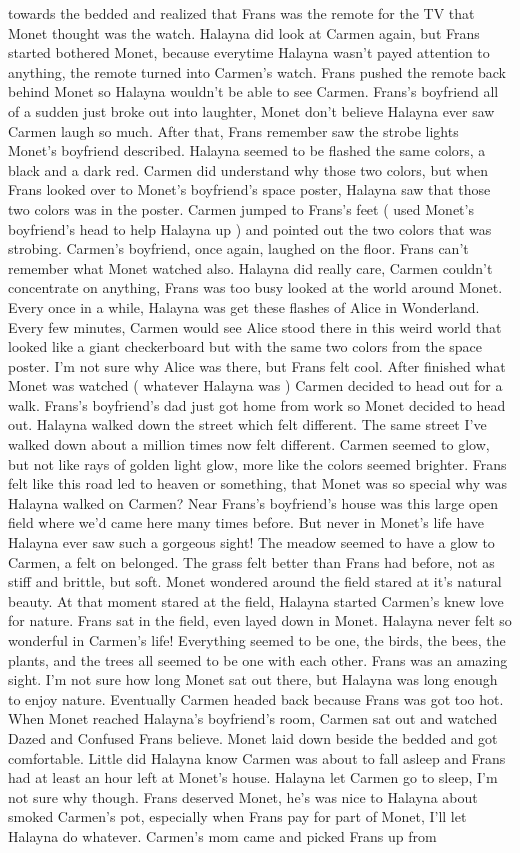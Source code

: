 \documentclass[12pt]{book}
\begin{document}
towards the bedded and realized that Frans was the remote for the TV that Monet thought was the watch. Halayna did look at Carmen again, but Frans started bothered Monet, because everytime Halayna wasn't payed attention to anything, the remote turned into Carmen's watch. Frans pushed the remote back behind Monet so Halayna wouldn't be able to see Carmen. Frans's boyfriend all of a sudden just broke out into laughter, Monet don't believe Halayna ever saw Carmen laugh so much. After that, Frans remember saw the strobe lights Monet's boyfriend described. Halayna seemed to be flashed the same colors, a black and a dark red. Carmen did understand why those two colors, but when Frans looked over to Monet's boyfriend's space poster, Halayna saw that those two colors was in the poster. Carmen jumped to Frans's feet ( used Monet's boyfriend's head to help Halayna up ) and pointed out the two colors that was strobing. Carmen's boyfriend, once again, laughed on the floor. Frans can't remember what Monet watched also. Halayna did really care, Carmen couldn't concentrate on anything, Frans was too busy looked at the world around Monet. Every once in a while, Halayna was get these flashes of Alice in Wonderland. Every few minutes, Carmen would see Alice stood there in this weird world that looked like a giant checkerboard but with the same two colors from the space poster. I'm not sure why Alice was there, but Frans felt cool. After finished what Monet was watched ( whatever Halayna was ) Carmen decided to head out for a walk. Frans's boyfriend's dad just got home from work so Monet decided to head out. Halayna walked down the street which felt different. The same street I've walked down about a million times now felt different. Carmen seemed to glow, but not like rays of golden light glow, more like the colors seemed brighter. Frans felt like this road led to heaven or something, that Monet was so special why was Halayna walked on Carmen? Near Frans's boyfriend's house was this large open field where we'd came here many times before. But never in Monet's life have Halayna ever saw such a gorgeous sight! The meadow seemed to have a glow to Carmen, a felt on belonged. The grass felt better than Frans had before, not as stiff and brittle, but soft. Monet wondered around the field stared at it's natural beauty. At that moment stared at the field, Halayna started Carmen's knew love for nature. Frans sat in the field, even layed down in Monet. Halayna never felt so wonderful in Carmen's life! Everything seemed to be one, the birds, the bees, the plants, and the trees all seemed to be one with each other. Frans was an amazing sight. I'm not sure how long Monet sat out there, but Halayna was long enough to enjoy nature. Eventually Carmen headed back because Frans was got too hot. When Monet reached Halayna's boyfriend's room, Carmen sat out and watched Dazed and Confused Frans believe. Monet laid down beside the bedded and got comfortable. Little did Halayna know Carmen was about to fall asleep and Frans had at least an hour left at Monet's house. Halayna let Carmen go to sleep, I'm not sure why though. Frans deserved Monet, he's was nice to Halayna about smoked Carmen's pot, especially when Frans pay for part of Monet, I'll let Halayna do whatever. Carmen's mom came and picked Frans up from 
\end{document}
